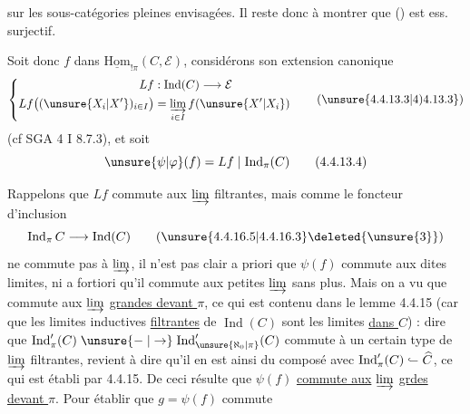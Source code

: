 sur les sous-catégories pleines envisagées. Il reste donc à montrer que () est ess. surjectif.

Soit donc $f$ dans $\underline{\mathrm{Hom}}_{!\pi}(C,\mathcal E)$, considérons son extension canonique
\[
\left\{\begin{aligned}
 Lf &: \operatorname{Ind}(C)\longrightarrow\mathcal E\\
 Lf\big((\unsure{X_i|X'})_{i\in I}\big)&=\varinjlim_{i\in I} f(\unsure{X'|X_i})
\end{aligned}\right.\tag*{(\unsure{4.4.13.3|4)4.13.3})}
\]
(cf SGA 4 I 8.7.3), et soit
\[
\unsure{\psi|\varphi}(f)=Lf\mid\operatorname{Ind}_\pi(C)\tag*{(4.4.13.4)}
\]

Rappelons que $Lf$ commute aux  $\varinjlim$ filtrantes, mais comme le foncteur d'inclusion
\[
\operatorname{Ind}_\pi C\longrightarrow\operatorname{Ind}(C)\tag*{(\unsure{4.4.16.5|4.4.16.3}\text{\deleted{\unsure{3}}})}
\]
ne commute pas à  $\varinjlim$,  il n'est pas clair a priori que $\psi(f)$ commute aux dites limites, ni a fortiori qu'il commute aux petites $\varinjlim$ sans plus. Mais on a vu que   commute aux $\varinjlim$ \uline{grandes devant $\pi$}, ce qui est contenu dans le lemme 4.4.15 (car que les limites inductives \uline{filtrantes} de $\operatorname{Ind}(C)$ sont les limites \uline{dans $\widehat C$}) : dire que $\operatorname{Ind}'_\pi(C)\mathrel{\unsure{\relbar|\to}}\operatorname{Ind}'_{\unsure{\aleph_0|\pi}}(C)$ commute à un certain type de $\varinjlim$ filtrantes, revient à dire qu'il en est ainsi du composé avec $\operatorname{Ind}'_\pi(C)\mathrel{\lhook\joinrel\relbar}\widehat C$, ce qui est établi par 4.4.15. De ceci résulte que $\psi(f)$ \uline{commute aux} $\varinjlim$ \uline{grdes devant $\pi$}. Pour établir que $g=\psi(f)$ commute
